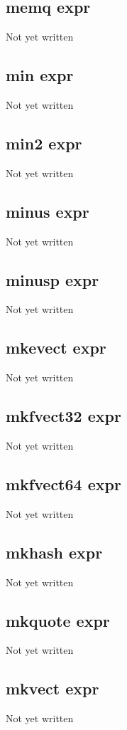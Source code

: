 \documentclass[a4paper,11pt]{article}
\begin{document}
\subsection{\ttfamily memq expr}
Not yet written

\subsection{\ttfamily min expr}
Not yet written

\subsection{\ttfamily min2 expr}
Not yet written

\subsection{\ttfamily minus expr}
Not yet written

\subsection{\ttfamily minusp expr}
Not yet written

\subsection{\ttfamily mkevect expr}
Not yet written

\subsection{\ttfamily mkfvect32 expr}
Not yet written

\subsection{\ttfamily mkfvect64 expr}
Not yet written

\subsection{\ttfamily mkhash expr}
Not yet written

\subsection{\ttfamily mkquote expr}
Not yet written

\subsection{\ttfamily mkvect expr}
Not yet written
\end{document}

